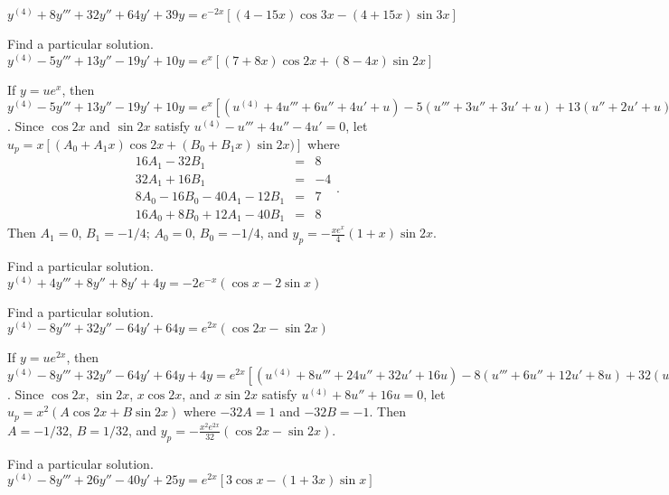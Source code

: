 \documentclass{ximera}
\begin{document}
\begin{problem}\label{exer:9.3.43}
$y^{(4)}+8y'''+32y''+64y'+39y=e^{-2x}[(4-15x)\cos3x-(4+15x)\sin
3x]$
\end{problem}

\begin{problem}\label{exer:9.3.44}   Find a particular solution.   $y^{(4)}-5y'''+13y''-19y'+10y=e^x[(7+8x)\cos 2x+(8-4x)\sin 2x]$

\begin{solution}
If $y=ue^x$, then
$y^{(4)}-5y'''+13y''-19y'+10y=e^x[
(u^{(4)}+4u'''+6u''+4u'+u) -5(u'''+3u''+3u'+u) +13(u''+2u'+u)
-19(u'+u) +10u]=e^x(u^{(4)}-u'''+4u''-4u')$.
Since $\cos2x$ and $\sin2x$ satisfy $u^{(4)}-u'''+4u''-4u'=0$,
let $u_p=x[(A_0+A_1x)\cos2x+(B_0+B_1x)\sin2x)]$ where
$$
\begin{array}{rcr}
16A_1-32B_1&=&8\\
32A_1+16B_1&=&-4\\
8A_0-16B_0-40A_1-12B_1&=&7\\
16A_0+8B_0+12A_1-40B_1&=&8
\end{array}.
$$
Then $A_1=0$, $B_1=-1/4$; $A_0=0$, $B_0=-1/4$, and
 $y_p=-\frac{xe^x}{4}(1+x)\sin2x$.
\end{solution}
\end{problem}

\begin{problem}\label{exer:9.3.45}   Find a particular solution.   $y^{(4)}+4y'''+8y''+8y'+4y=-2e^{-x}
(\cos x-2\sin x)$
\end{problem}

\begin{problem}\label{exer:9.3.46}   Find a particular solution.   $y^{(4)}-8y'''+32y''-64y'+64y=e^{2x}
(\cos2x-\sin2x)$

\begin{solution}
If $y=ue^{2x}$, then
$y^{(4)}-8y'''+32y''-64y'+64y+4y=e^{2x}[
(u^{(4)}+8u'''+24u''+32u'+16u) -8(u'''+6u''+12u'+8u) +32(u''+4u'+4u)
-64(u'+2u) +64u]=e^{2x}(u^{(4)}+8u''+16u)$. Since $\cos2x$,  $\sin2x$, $x\cos2x$,
and $x\sin2x$ satisfy $u^{(4)}+8u''+16u=0$,
let $u_p=x^2(A\cos2x+B\sin2x)$ where $-32A=1$ and $-32B=-1$. Then
$A=-1/32$, $B=1/32$, and
 $y_p=-\frac{x^2e^{2x}}{32}(\cos2x-\sin2x)$.
\end{solution}
\end{problem}

\begin{problem}\label{exer:9.3.47}   Find a particular solution.   $y^{(4)}-8y'''+26y''-40y'+25y=e^{2x}[3\cos
x-(1+3x)\sin x]$
\end{problem}
\end{document}
